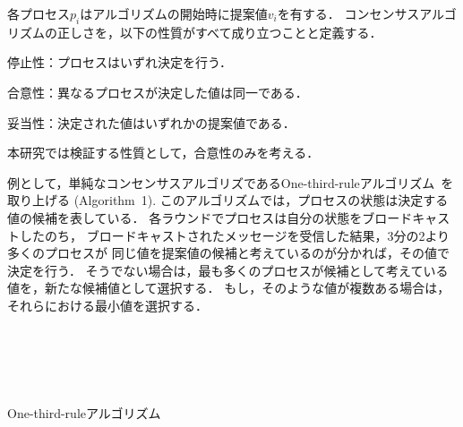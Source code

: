 \documentclass[technicalreport]{ieicej}
\theoremstyle{plain}
\begin{document}
各プロセス$p_i$はアルゴリズムの開始時に提案値$v_i$を有する．
コンセンサスアルゴリズムの正しさを，以下の性質がすべて成り立つことと定義する．

停止性：プロセスはいずれ決定を行う．

合意性：異なるプロセスが決定した値は同一である．

妥当性：決定された値はいずれかの提案値である．

本研究では検証する性質として，合意性のみを考える．


例として，単純なコンセンサスアルゴリズであるOne-third-ruleアルゴリズム~\cite{HOjournal}を取り上げる (Algorithm~1). 
このアルゴリズムでは，プロセスの状態は決定する値の候補を表している．
各ラウンドでプロセスは自分の状態をブロードキャストしたのち，
ブロードキャストされたメッセージを受信した結果，3分の2より多くのプロセスが
同じ値を提案値の候補と考えているのが分かれば，その値で決定を行う．
そうでない場合は，最も多くのプロセスが候補として考えている値を，新たな候補値として選択する．
もし，そのような値が複数ある場合は，それらにおける最小値を選択する．
\begin{algorithm}[ht]
    \normalsize{
        \begin{distribalgo}[1]
           
             \\ 
            \ENDINDENT 
            \BLANK
            
             \\
             \\
{}
\ENDIF
            \ENDIF

            \ENDINDENT
            \caption{One-third-ruleアルゴリズム}
            \label{algo:bakery}
        \end{distribalgo}
    }
\end{algorithm}
\end{document}

